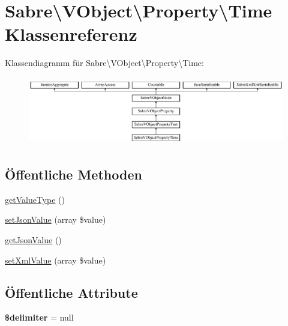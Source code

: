 \hypertarget{class_sabre_1_1_v_object_1_1_property_1_1_time}{}\section{Sabre\textbackslash{}V\+Object\textbackslash{}Property\textbackslash{}Time Klassenreferenz}
\label{class_sabre_1_1_v_object_1_1_property_1_1_time}
Klassendiagramm für Sabre\textbackslash{}V\+Object\textbackslash{}Property\textbackslash{}Time\+:\begin{figure}[H]
\begin{center}
\leavevmode
\includegraphics[height=2.994652cm]{class_sabre_1_1_v_object_1_1_property_1_1_time}
\end{center}
\end{figure}
\subsection*{Öffentliche Methoden}
\begin{DoxyCompactItemize}
\item 
\mbox{\hyperlink{class_sabre_1_1_v_object_1_1_property_1_1_time_aeaf991a46605cc727cdf033b0a12a527}{get\+Value\+Type}} ()
\item 
\mbox{\hyperlink{class_sabre_1_1_v_object_1_1_property_1_1_time_a5a666f85b8c759f760cc24666143f065}{set\+Json\+Value}} (array \$value)
\item 
\mbox{\hyperlink{class_sabre_1_1_v_object_1_1_property_1_1_time_ab6173ff40dbb5bf1f0a55c62b1c3a5ac}{get\+Json\+Value}} ()
\item 
\mbox{\hyperlink{class_sabre_1_1_v_object_1_1_property_1_1_time_ac99cf739ce4cfab3000d23ce0df4905b}{set\+Xml\+Value}} (array \$value)
\end{DoxyCompactItemize}
\subsection*{Öffentliche Attribute}
\begin{DoxyCompactItemize}
\item 
\mbox{\label{class_sabre_1_1_v_object_1_1_property_1_1_time_a778c8bc7da61d5c99ce498832e21a420}} 
{\bfseries \$delimiter} = null
\end{DoxyCompactItemize}
